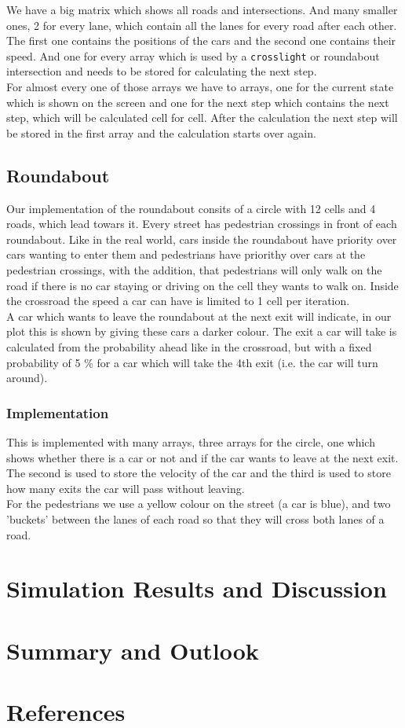 \documentclass[11pt]{article}
\begin{document}
We have a big matrix which shows all roads and intersections. And many smaller ones, 2 for every lane, which contain all the lanes for every road after each other. 
The first one contains the positions of the cars and the second one contains their speed. And one for every array which is used by a \texttt{crosslight} or roundabout intersection and needs to be stored for calculating the next step.\\

For almost every one of those arrays we have to arrays, one for the current state which is shown on the screen and one for the next step which contains the next step, which will be calculated cell for cell. 
After the calculation the next step will be stored in the first array and the calculation starts over again.

\subsection{Roundabout}
Our implementation of the roundabout consits of a circle with 12 cells and 4 roads, which lead towars it. Every street has pedestrian crossings in front of each roundabout. 
Like in the real world, cars inside the roundabout have priority over cars wanting to enter them and pedestrians have priorithy over cars at the pedestrian crossings, 
with the addition, that pedestrians will only walk on the road if there is no car staying or driving on the cell they wants to walk on. 
Inside the crossroad the speed a car can have is limited to 1 cell per iteration. \\

A car which wants to leave the roundabout at the next exit will indicate, in our plot this is shown by giving these cars a darker colour. 
The exit a car will take is calculated from the probability ahead like in the crossroad, but with a fixed probability of 5 \% for a car which will take the 4th exit (i.e. the car will turn around). \\
\subsubsection{Implementation}
This is implemented with many arrays, three arrays for the circle, one which shows whether there is a car or not and if the car wants to leave at the next exit. 
The second is used to store the velocity of the car and the third is used to store how many exits the car will pass without leaving.\\

For the pedestrians we use a yellow colour on the street (a car is blue), and two 'buckets' between the lanes of each road so that they will cross both lanes of a road.


\section{Simulation Results and Discussion}

\section{Summary and Outlook}

\section{References}
\end{document}
